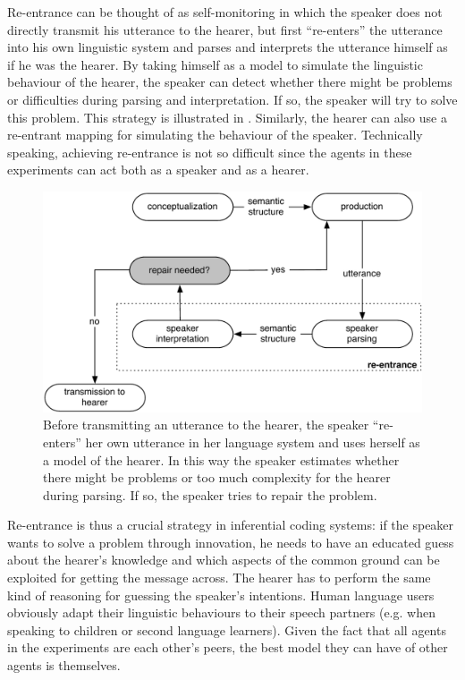 Re-entrance can be thought of as self-monitoring in which the speaker does not directly transmit his utterance to the hearer, but first ``re-enters'' the utterance into his own linguistic system and parses and interprets the utterance himself as if he was the hearer. By taking himself as a model to simulate the linguistic behaviour of the hearer, the speaker can detect whether there might be problems or difficulties during parsing and interpretation. If so, the speaker will try to solve this problem. This strategy is illustrated in . Similarly, the hearer can also use a re-entrant mapping for simulating the behaviour of the speaker. Technically speaking, achieving re-entrance is not so difficult since the agents in these experiments can act both as a speaker and as a hearer.

\begin{figure}[b]
\centerline{\includegraphics[width=\linewidth]{Chapter3/figs/re-entrance}}
  \caption[Speaker re-entrance]{Before transmitting an utterance to the hearer, the speaker ``re-enters'' her own utterance in her language system and uses herself as a model of the hearer. In this way the speaker estimates whether there might be problems or too much complexity for the hearer during parsing. If so, the speaker tries to repair the problem.}
   \label{f:re-entrance}
\end{figure}


Re-entrance is thus a crucial strategy in inferential coding systems: if the speaker wants to solve a problem through innovation, he needs to have an educated guess about the hearer's knowledge and which aspects of the common ground can be exploited for getting the message across. The hearer has to perform the same kind of reasoning for guessing the speaker's intentions. Human language users obviously adapt their linguistic behaviours to their speech partners (e.g. when speaking to children or second language learners). Given the fact that all agents in the experiments are each other's peers, the best model they can have of other agents is themselves.


